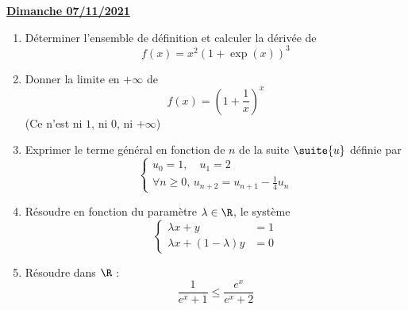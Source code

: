 \documentclass[a4paper, 11pt,reqno]{article}
\newcommand{\jour}[1]{
\begin{center}
\underline{\textbf{#1}}
\end{center}

 }
\begin{document}
\jour{Dimanche  07/11/2021}
\begin{exercice}
\begin{enumerate}
\item  Déterminer l'ensemble de définition et calculer la dérivée de
$$f(x) = x^2(1+\exp(x))^3$$
\item Donner la limite en $+\infty $ de 
$$f(x) = \left(1+\frac{1}{x}\right)^x$$
(Ce n'est ni $1$, ni $0$, ni $+\infty$) 
\item Exprimer le terme général en fonction de $n$ de la suite $\suite{u}$ définie par 
$$\left\{\begin{array}{l}
u_0 =1, \quad u_1=2\\
\forall n\geq 0,\,  u_{n+2}=u_{n+1}-\frac{1}{4}u_n
\end{array}\right.$$
\item Résoudre en fonction du paramètre $\lambda\in \R$, le système $$\left\{ 
\begin{array}{cc}
\lambda x+y&=1\\
\lambda x+(1-\lambda)y&=0
\end{array}
\right.$$
\item Résoudre dans $\R$ : 
$$\frac{1}{e^x+1}\leq \frac{e^x}{e^x+2}$$
\end{enumerate}
\end{exercice}
\end{document}
